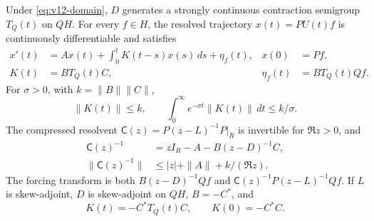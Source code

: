 \begin{theorem}
\label{thm:v12-memory}
Under \eqref{eq:v12-domain}, $D$ generates a strongly continuous
contraction semigroup $T_Q(t)$ on $QH$. For every $f\in H$, the resolved
trajectory $x(t)=PU(t)f$ is continuously differentiable and satisfies
\begin{align}
 x'(t)&=Ax(t)+\int_0^t K(t-s)x(s)\,ds+\eta_f(t),
       & x(0)&=Pf,\label{eq:v12-volterra}\\
 K(t)&=BT_Q(t)C,
       &\eta_f(t)&=BT_Q(t)Qf.\label{eq:v12-kernel}
\end{align}
For $\sigma>0$, with $k=\|B\|\|C\|$,
\begin{equation}
 \|K(t)\|\le k,\qquad
 \int_0^\infty e^{-\sigma t}\|K(t)\|\,dt\le k/\sigma.
 \label{eq:v12-kernel-bound}
\end{equation}
The compressed resolvent $\mathsf C(z)=P(z-L)^{-1}P|_R$ is invertible for
$\Re z>0$, and
\begin{align}
 \mathsf C(z)^{-1}&=zI_R-A-B(z-D)^{-1}C,\label{eq:v12-schur}\\
 \|\mathsf C(z)^{-1}\|&\le |z|+\|A\|+k/(\Re z).
 \label{eq:v12-schur-bound}
\end{align}
The forcing transform is both $B(z-D)^{-1}Qf$ and
$\mathsf C(z)^{-1}P(z-L)^{-1}Qf$. If $L$ is skew-adjoint, $D$ is
skew-adjoint on $QH$, $B=-C^*$, and
\begin{equation}
 K(t)=-C^*T_Q(t)C,\qquad K(0)=-C^*C.
 \label{eq:v12-sign}
\end{equation}
\end{theorem}

